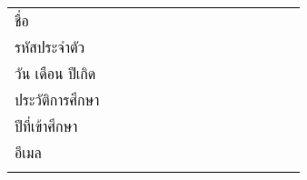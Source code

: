\makeatletter
{}
\begin{longtable}{@{}p{0.34\linewidth}@{}p{0.66\linewidth}@{}}
	ชื่อ									& \@nametitle\@authorThai\\
	\ifdefined\@cruStudentId รหัสประจำตัว   & \@cruStudentId\\ \fi
	วัน เดือน ปีเกิด							& \@dateofbirth\\
	ประวัติการศึกษา			 & \parbox[t]{\linewidth}{\strut\@eduattainment \strut}\\
	\ifdefined\@yearOfEnroll ปีที่เข้าศึกษา & \@yearOfEnroll\\ \fi
	\ifdefined\@email อีเมล & \@email\\ \fi
	

\end{longtable}


\makeatother